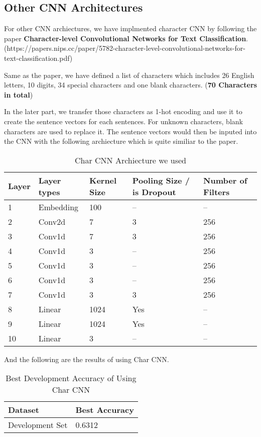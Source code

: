 \documentclass{article}
\begin{document}
\subsection{Other CNN Architectures}
For other CNN archiectures, we have implmented character CNN by following the paper \textbf{Character-level Convolutional Networks for Text Classification}. (https://papers.nips.cc/paper/5782-character-level-convolutional-networks-for-text-classification.pdf) 

Same as the paper, we have defined a list of characters which includes 26 English letters, 10 digits, 34 special characters and one blank characters. (\textbf{70 Characters in total})

In the later part, we transfer those characters as 1-hot encoding and use it to create the sentence vectors for each sentences. For unknown characters, blank characters are used to replace it. The sentence vectors would then be inputed into the CNN with the following archiecture which is quite similiar to the paper.

\begin{table}[htb]
\caption{Char CNN Archiecture we used}
	\label{sample-table}
	\centering
\begin{tabular}{lllll}
\toprule
		\cmidrule{1-5}
		Layer & Layer types & Kernel Size & Pooling Size / is Dropout & Number of Filters 		\\
		\midrule
 			1 & Embedding & 100 & -- & -- \\
 			2 & Conv2d & 7 & 3 & 256 \\
 			3 & Conv1d & 7 & 3 & 256 \\
 			4 & Conv1d & 3 & -- & 256 \\
 			5 & Conv1d & 3 & -- & 256\\
 			6 & Conv1d & 3 & -- & 256 \\
 			7 & Conv1d & 3 & 3 & 256 \\
 			8 & Linear & 1024 & Yes & -- \\
 			9 & Linear & 1024 & Yes & -- \\
 			10 & Linear & 3 & -- & -- \\
\bottomrule
\end{tabular}
\end{table}

And the following are the results of using Char CNN. 

\begin{table}[htb]
	\caption{Best Development Accuracy of Using Char CNN}
	\label{sample-table}
	\centering
	\begin{tabular}{ll}
		\toprule
		\cmidrule{1-2}
		Dataset & Best Accuracy\\
		\midrule
		Development Set & 0.6312  \\
		\bottomrule
	\end{tabular}
\end{table}
\end{document}
